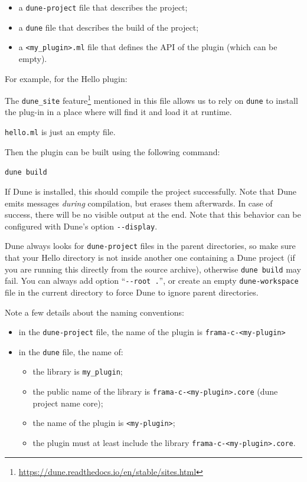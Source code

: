 \begin{itemize}
  \item a \texttt{dune-project} file that describes the project;
  \item a \texttt{dune} file that describes the build of the project;
  \item a \texttt{<my\_plugin>.ml} file that defines the API of the plugin
    (which can be empty).
\end{itemize}

For example, for the Hello plugin:


The \texttt{dune\_site} feature\footnote{\url{https://dune.readthedocs.io/en/stable/sites.html}}
 mentioned in this file allows us to rely on
\texttt{dune} to install the plug-in in a place where \framac will find it
and load it at runtime.


\texttt{hello.ml} is just an empty file.

Then the plugin can be built using the following command:

\lstinline{dune build}

If Dune is installed, this should compile the project successfully.
Note that Dune emits messages {\em during} compilation, but erases them
afterwards. In case of success, there will be no visible output at the end.
Note that this behavior can be configured with Dune's option \verb|--display|.

\begin{important}
  Dune always looks for \texttt{dune-project} files in the parent directories,
  so make sure that your Hello directory is not inside another one containing
  a Dune project (\eg if you are running this directly from the \framac source
  archive), otherwise \verb|dune build| may fail. You can always add option
  ``\verb|--root .|'', or create an empty \texttt{dune-workspace} file in
  the current directory to force Dune to ignore parent directories.
\end{important}

Note a few details about the naming conventions:
\begin{itemize}
  \item in the \texttt{dune-project} file, the name of the plugin is
    \texttt{frama-c-<my-plugin>}
  \item in the \texttt{dune} file, the name of:
  \begin{itemize}
  \item the library is \texttt{my\_plugin};
  \item the public name of the library is \texttt{frama-c-<my-plugin>.core}
    (dune project name core);
  \item the name of the plugin is \texttt{<my-plugin>};
  \item the plugin must at least include the library
    \texttt{frama-c-<my-plugin>.core}.
  \end{itemize}
\end{itemize}

